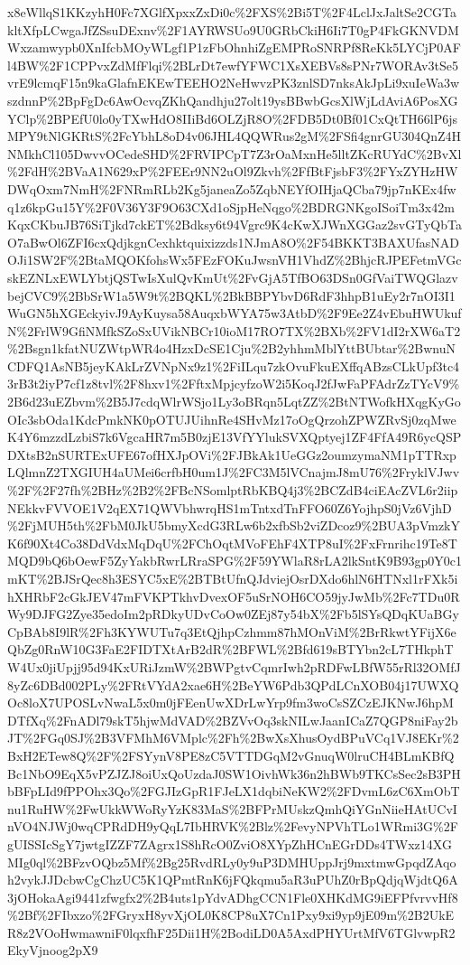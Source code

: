 \documentclass[12pt,letterpaper]{article}
\begin{document}
\begin{landscape}
\begin{center}
x8eWllqS1KKzyhH0Fc7XGlfXpxxZxDi0c\%2FXS\%2Bi5T\%2F4LclJxJaltSe2CGTakltXfpLCwgaJfZSsuDExnv\%2F1AYRWSUo9U0GRbCkiH6Ii7T0gP4FkGKNVDMWxzamwypb0XnIfcbMOyWLgf1P1zFbOhnhiZgEMPRoSNRPf8ReKk5LYCjP0AFl4BW\%2F1CPPvxZdMfFlqi\%2BLrDt7ewfYFWC1XsXEBVs8sPNr7WORAv3tSe5vrE9lcmqF15n9kaGlafnEKEwTEEHO2NeHwvzPK3znlSD7nksAkJpLi9xuIeWa3wszdnnP\%2BpFgDc6AwOcvqZKhQandhju27olt19ysBBwbGcsXlWjLdAviA6PosXGYClp\%2BPEfU0lo0yTXwHdO8IIiBd6OLZjR8O\%2FDB5Dt0Bf01CxQtTH66lP6jsMPY9tNlGKRtS\%2FcYbhL8oD4v06JHL4QQWRus2gM\%2FSfi4gnrGU304QnZ4HNMkhCl105DwvvOCedeSHD\%2FRVIPCpT7Z3rOaMxnHe5lltZKcRUYdC\%2BvXl\%2FdH\%2BVaA1N629xP\%2FEEr9NN2uOl9Zkvh\%2FfBtFjsbF3\%2FYxZYHzHWDWqOxm7NmH\%2FNRmRLb2Kg5janeaZo5ZqbNEYfOIHjaQCba79jp7nKEx4fwq1z6kpGu15Y\%2F0V36Y3F9O63CXd1oSjpHeNqgo\%2BDRGNKgoISoiTm3x42mKqxCKbuJB76SiTjkd7ckET\%2Bdksy6t94Vgrc9K4cKwXJWnXGGaz2svGTyQbTaO7aBwOl6ZFI6cxQdjkgnCexhktquixizzds1NJmA8O\%2F54BKKT3BAXUfasNADOJi1SW2F\%2BtaMQOKfohsWx5FEzFOKuJwsnVH1VhdZ\%2BhjcRJPEFetmVGcskEZNLxEWLYbtjQSTwIsXulQvKmUt\%2FvGjA5TfBO63DSn0GfVaiTWQGlazvbejCVC9\%2BbSrW1a5W9t\%2BQKL\%2BkBBPYbvD6RdF3hhpB1uEy2r7nOI3I1WuGN5hXGEckyivJ9AyKuysa58AuqxbWYA75w3AtbD\%2F9Ee2Z4vEbuHWUkufN\%2FrlW9GfiNMfkSZoSxUVikNBCr10ioM17RO7TX\%2BXb\%2FV1dI2rXW6aT2\%2Bsgn1kfatNUZWtpWR4o4HzxDcSE1Cju\%2B2yhhmMblYttBUbtar\%2BwnuNCDFQ1AsNB5jeyKAkLrZVNpNx9z1\%2FiILqu7zkOvuFkuEXffqABzsCLkUpf3tc43rB3t2iyP7cf1z8tvl\%2F8hxv1\%2FftxMpjcyfzoW2i5KoqJ2fJwFaPFAdrZzTYcV9\%2B6d23uEZbvm\%2B5J7cdqWlrWSjo1Ly3oBRqn5LqtZZ\%2BtNTWofkHXqgKyGoOIc3sbOda1KdcPmkNK0pOTUJUihnRe4SHvMz17oOgQrzohZPWZRvSj0zqMweK4Y6mzzdLzbiS7k6VgcaHR7m5B0zjE13VfYYlukSVXQptyej1ZF4FfA49R6ycQSPDXtsB2nSURTExUFE67ofHXJpOVi\%2FJBkAk1UeGGz2oumzymaNM1pTTRxpLQlmnZ2TXGIUH4aUMei6crfbH0um1J\%2FC3M5lVCnajmJ8mU76\%2FryklVJwv\%2F\%2F27fh\%2BHz\%2B2\%2FBcNSomlptRbKBQ4j3\%2BCZdB4ciEAcZVL6r2iipNEkkvFVVOE1V2qEX71QWVbhwrqHS1mTntxdTnFFO60Z6YojhpS0jVz6VjhD\%2FjMUH5th\%2FbM0JkU5bmyXcdG3RLw6b2xfbSb2viZDcoz9\%2BUA3pVmzkYK6f90Xt4Co38DdVdxMqDqU\%2FChOqtMVoFEhF4XTP8uI\%2FxFrnrihc19Te8TMQD9bQ6bOewF5ZyYakbRwrLRraSPG\%2F59YWlaR8rLA2lkSntK9B93gp0Y0c1mKT\%2BJSrQec8h3ESYC5xE\%2BTBtUfnQJdviejOsrDXdo6hlN6HTNxl1rFXk5ihXHRbF2cGkJEV47mFVKPTkhvDvexOF5uSrNOH6CO59jyJwMb\%2Fc7TDu0RWy9DJFG2Zye35edoIm2pRDkyUDvCoOw0ZEj87y54bX\%2Fb5lSYsQDqKUaBGyCpBAb8I9lR\%2Fh3KYWUTu7q3EtQjhpCzhmm87hMOnViM\%2BrRkwtYFijX6eQbZg0RnW10G3FaE2FIDTXtArB2dR\%2BFWL\%2Bfd619sBTYbn2cL7THkphTW4Ux0jiUpjj95d94KxURiJzmW\%2BWPgtvCqmrIwh2pRDFwLBfW55rRl32OMfJ8yZc6DBd002PLy\%2FRtVYdA2xae6H\%2BeYW6Pdb3QPdLCnXOB04j17UWXQOc8loX7UPOSLvNwaL5x0m0jFEenUwXDrLwYrp9fm3woCsSZCzEJKNwJ6hpMDTfXq\%2FnADl79skT5hjwMdVAD\%2BZVvOq3skNILwJaanICaZ7QGP8niFay2bJT\%2FGq0SJ\%2B3VFMhM6VMplc\%2Fh\%2BwXsXhusOydBPuVCq1VJ8EKr\%2BxH2ETew8Q\%2F\%2FSYynV8PE8zC5VTTDGqM2vGnuqW0lruCH4BLmKBfQBc1NbO9EqX5vPZJZJ8oiUxQoUzdaJ0SW1OivhWk36n2hBWb9TKCsSec2sB3PHbBFpLId9fPPOhx3Qo\%2FGJIzGpR1FJeLX1dqbiNeKW2\%2FDvmL6zC6XmObTnu1RuHW\%2FwUkkWWoRyYzK83MaS\%2BFPrMUskzQmhQiYGnNiieHAtUCvInVO4NJWj0wqCPRdDH9yQqL7IbHRVK\%2Blz\%2FevyNPVhTLo1WRmi3G\%2FgUISSIcSgY7jwtgIZZF7ZAgrx1S8hRcO0ZviO8XYpZhHCnEGrDDs4TWxz14XGMIg0ql\%2BFzvOQbz5Mf\%2Bg25RvdRLy0y9uP3DMHUppJrj9mxtmwGpqdZAqoh2vykJJDcbwCgChzUC5K1QPmtRnK6jFQkqmu5aR3uPUhZ0rBpQdjqWjdtQ6A3jOHokaAgi9441zfwgfx2\%2B4uts1pYdvADhgCCN1Fle0XHKdMG9iEFPfvrvvHf8\%2Bf\%2FIbxzo\%2FGryxH8yvXjOL0K8CP8uX7Cn1Pxy9xi9yp9jE09m\%2B2UkER8z2VOoHwmawniF0lqxfhF25Dii1H\%2BodiLD0A5AxdPHYUrtMfV6TGlvwpR2EkyVjnoog2pX9
\end{center}
\end{landscape}
\end{document}

